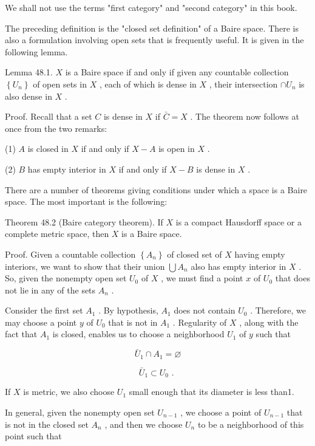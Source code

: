 We shall not use the terms "first category" and "second category" in this book.

The preceding definition is the "closed set definition" of a Baire space. There is also a formulation involving open sets that is frequently useful. It is given in the following lemma.

Lemma 48.1. \(X\) is a Baire space if and only if given any countable collection \(\left\{  {U}_{n}\right\}\) of open sets in \(X\) , each of which is dense in \(X\) , their intersection \(\cap  {U}_{n}\) is also dense in \(X\) .

Proof. Recall that a set \(C\) is dense in \(X\) if \(\bar{C} = X\) . The theorem now follows at once from the two remarks:

(1) \(A\) is closed in \(X\) if and only if \(X - A\) is open in \(X\) .

(2) \(B\) has empty interior in \(X\) if and only if \(X - B\) is dense in \(X\) .

There are a number of theorems giving conditions under which a space is a Baire space. The most important is the following:

Theorem 48.2 (Baire category theorem). If \(X\) is a compact Hausdorff space or a complete metric space, then \(X\) is a Baire space.

Proof. Given a countable collection \(\left\{  {A}_{n}\right\}\) of closed set of \(X\) having empty interiors, we want to show that their union \(\bigcup {A}_{n}\) also has empty interior in \(X\) . So, given the nonempty open set \({U}_{0}\) of \(X\) , we must find a point \(x\) of \({U}_{0}\) that does not lie in any of the sets \({A}_{n}\) .

Consider the first set \({A}_{1}\) . By hypothesis, \({A}_{1}\) does not contain \({U}_{0}\) . Therefore, we may choose a point \(y\) of \({U}_{0}\) that is not in \({A}_{1}\) . Regularity of \(X\) , along with the fact that \({A}_{1}\) is closed, enables us to choose a neighborhood \({U}_{1}\) of \(y\) such that

\[
{\bar{U}}_{1} \cap  {A}_{1} = \varnothing
\]

\[
{\bar{U}}_{1} \subset  {U}_{0}\text{ . }
\]

If \(X\) is metric, we also choose \({U}_{1}\) small enough that its diameter is less than1.

In general, given the nonempty open set \({U}_{n - 1}\) , we choose a point of \({U}_{n - 1}\) that is not in the closed set \({A}_{n}\) , and then we choose \({U}_{n}\) to be a neighborhood of this point such that

